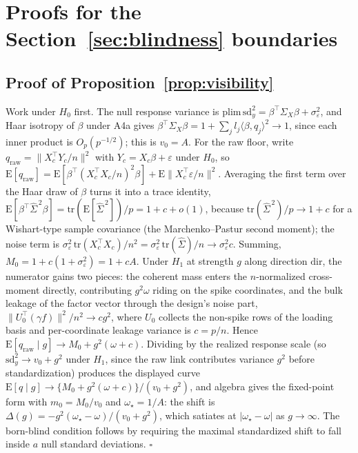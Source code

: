 \documentclass[11pt]{article}
\theoremstyle{definition}
\theoremstyle{remark}
\newcommand{\E}{\mathrm{E}}
\begin{document}
\section{Proofs for the Section~\ref{sec:blindness} boundaries}\label{app:sec5proofs}

\subsection*{Proof of Proposition~\ref{prop:visibility}}

Work under $H_0$ first. The null response variance is $\mathrm{plim}\,\mathrm{sd}_y^2=\beta^\top\Sigma_X\beta+\sigma_\varepsilon^2$, and Haar isotropy of $\beta$ under A4a gives $\beta^\top\Sigma_X\beta=1+\sum_j l_j\langle\beta,q_j\rangle^2\to1$, since each inner product is $O_p(p^{-1/2})$; this is $v_0=A$. For the raw floor, write $q_{\mathrm{raw}}=\|X_c^\top Y_c/n\|^2$ with $Y_c=X_c\beta+\varepsilon$ under $H_0$, so
$\E[q_{\mathrm{raw}}]=\E[\beta^\top(X_c^\top X_c/n)^2\beta]+\E\|X_c^\top\varepsilon/n\|^2$.
Averaging the first term over the Haar draw of $\beta$ turns it into a trace identity, $\E[\beta^\top\hat\Sigma^{\,2}\beta]=\mathrm{tr}(\E[\hat\Sigma^{\,2}])/p=1+c+o(1)$, because $\mathrm{tr}(\hat\Sigma^{\,2})/p\to1+c$ for a Wishart-type sample covariance (the Marchenko--Pastur second moment); the noise term is $\sigma_\varepsilon^2\,\mathrm{tr}(X_c^\top X_c)/n^2=\sigma_\varepsilon^2\,\mathrm{tr}(\hat\Sigma)/n\to\sigma_\varepsilon^2 c$. Summing, $M_0=1+c(1+\sigma_\varepsilon^2)=1+cA$. Under $H_1$ at strength $g$ along direction $\mathrm{dir}$, the numerator gains two pieces: the coherent mass enters the $n$-normalized cross-moment directly, contributing $g^2\omega$ riding on the spike coordinates, and the bulk leakage of the factor vector through the design's noise part, $\|U_0^\top(\gamma f)\|^2/n^2\to cg^2$, where $U_0$ collects the non-spike rows of the loading basis and per-coordinate leakage variance is $c=p/n$. Hence $\E[q_{\mathrm{raw}}\mid g]\to M_0+g^2(\omega+c)$. Dividing by the realized response scale (so $\mathrm{sd}_y^2\to v_0+g^2$ under $H_1$, since the raw link contributes variance $g^2$ before standardization) produces the displayed curve
$\E[q\mid g]\to\{M_0+g^2(\omega+c)\}/(v_0+g^2)$,
and algebra gives the fixed-point form with $m_0=M_0/v_0$ and $\omega_\star=1/A$: the shift is $\Delta(g)=-g^2(\omega_\star-\omega)/(v_0+g^2)$, which satiates at $|\omega_\star-\omega|$ as $g\to\infty$. The born-blind condition follows by requiring the maximal standardized shift to fall inside $a$ null standard deviations. \hfill$\square$
\end{document}
